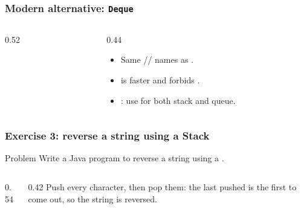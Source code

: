 \documentclass[aspectratio=169,10pt,compress]{beamer}
\begin{document}
\begin{frame}[t,fragile] \frametitle{Modern alternative: \texttt{Deque}}
  \begin{columns}[T]
    \begin{column}{0.52\textwidth}
    \end{column}
    \begin{column}{0.44\textwidth}
      \small
      \begin{itemize}
        \item Same // names as .
        \item {} is faster and forbids .
        \item {}: use  for both
              stack and queue.
      \end{itemize}
    \end{column}
  \end{columns}
\end{frame}




\begin{frame}[t,fragile] \frametitle{Exercise 3: reverse a string using a Stack}
  \begin{block}{Problem}
    Write a Java program to reverse a string using a .
  \end{block}
  \begin{columns}[T]
    \begin{column}{0.54\textwidth}
    \end{column}
    \begin{column}{0.42\textwidth}
      \small
      Push every character, then pop them: the last pushed is the
      first to come out, so the string is reversed.
    \end{column}
  \end{columns}
\end{frame}

\end{document}

